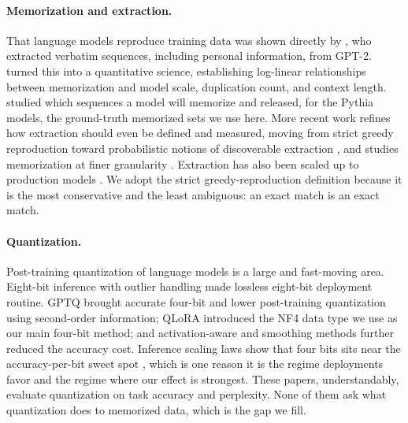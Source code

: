 \documentclass{article}
\begin{document}
\paragraph{Memorization and extraction.}
That language models reproduce training data was shown directly by
\citet{carlini2021extracting}, who extracted verbatim sequences, including
personal information, from GPT-2. \citet{carlini2022quantifying} turned this
into a quantitative science, establishing log-linear relationships between
memorization and model scale, duplication count, and context length.
\citet{biderman2023emergent} studied which sequences a model will memorize
and released, for the Pythia models, the ground-truth memorized sets we use
here. More recent work refines how extraction should even be defined and
measured, moving from strict greedy reproduction toward probabilistic notions
of discoverable extraction \citep{hayes2024measuring}, and studies
memorization at finer granularity \citep{zhou2023entity}. Extraction has also
been scaled up to production models \citep{nasr2023scalable}. We adopt the
strict greedy-reproduction definition because it is the most conservative and
the least ambiguous: an exact match is an exact match.

\paragraph{Quantization.}
Post-training quantization of language models is a large and fast-moving
area. Eight-bit inference with outlier handling \citep{dettmers2022int8}
made lossless eight-bit deployment routine. GPTQ \citep{frantar2022gptq}
brought accurate four-bit and lower post-training quantization using
second-order information; QLoRA \citep{dettmers2023qlora} introduced the NF4
data type we use as our main four-bit method; and activation-aware and
smoothing methods \citep{lin2023awq,xiao2023smoothquant} further reduced the
accuracy cost. Inference scaling laws show that four bits sits near the
accuracy-per-bit sweet spot \citep{dettmers2023kbit}, which is one reason it
is the regime deployments favor and the regime where our effect is
strongest. These papers, understandably, evaluate quantization on task
accuracy and perplexity. None of them ask what quantization does to
memorized data, which is the gap we fill.
\end{document}
